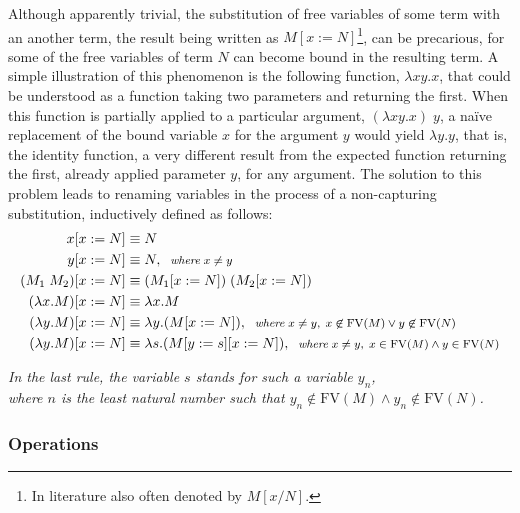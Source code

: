 \documentclass[table, a4paper, 10pt]{article}
\begin{document}
Although apparently trivial, the substitution of free variables of some term with an another term,
the result being written as $M[x := N]$\footnote{In literature also often denoted by $M[x/N]$.},
can be precarious, for some of the 
free variables of term $N$ can become bound in the resulting term. A simple illustration of this
phenomenon is the following function, $\lambda xy.x$, that could be understood as a function
taking two parameters and returning the first. When this function is partially
applied to a particular argument, $(\lambda xy.x)\;y$, a na\"ive replacement of 
the bound variable $x$ for the argument $y$ would yield
$\lambda y.y$, that is, the identity function, a very different result from the expected function returning
the first, already applied parameter $y$, for any argument. The solution to this problem leads
to renaming variables in the process of a non-capturing substitution, inductively defined as follows:
\begin{align*}
\vspace{1cm}x[x := N] &\equiv N\\
\vspace{1cm}y[x := N] &\equiv N,\;\;\text{\footnotesize\textit{where}$\;x \not= y$}\\
\vspace{1cm}(M_1\;M_2)[x := N] &\equiv (M_1[x := N])\;(M_2[x := N])\\
\vspace{1cm}(\lambda x.M)[x := N] &\equiv \lambda x.M\\
\vspace{1cm}(\lambda y.M)[x := N] &\equiv \lambda y.(M[x := N]),\;\;\text{\footnotesize\textit{where}$\;x \not= y,\;x \not\in \mathrm{FV}(M) \lor y \not\in \mathrm{FV}(N)$}\\
\vspace{1cm}(\lambda y.M)[x := N] &\equiv \lambda s.(M[y := s][x := N]),\;\;\text{\footnotesize\textit{where}$\;x \not= y,\;x\in \mathrm{FV}(M) \land y \in \mathrm{FV}(N)$}
\end{align*}
\begin{center}\footnotesize
\textit{In the last rule, the variable $s$ stands for such a variable $y_n$,
\\where $n$ is the least natural number such that $y_n \not\in \mathrm{FV}(M) \land y_n \not\in \mathrm{FV}(N)$.}
\end{center}

\subsubsection{Operations}\label{sec:red}
\end{document}

